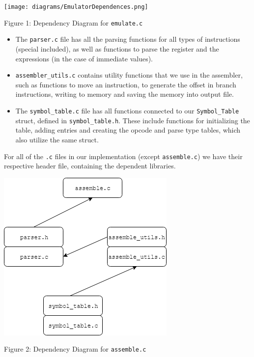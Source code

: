 \documentclass[11pt]{article}
\begin{document}
\hspace{0.05\linewidth}
\begin{minipage}{0.35\linewidth}

\centering

\texttt{[image: diagrams/EmulatorDependences.png]}
\caption{Figure 1: Dependency Diagram for \texttt{emulate.c}}

\end{minipage}
    \begin{itemize}
    \item The \texttt{parser.c} file has all the parsing functions for all types of instructions (special included), as well as functions to parse the register and the expressions (in the case of immediate values).
    \end{itemize}
\begin{minipage}{0.6\linewidth}
    \begin{itemize}
    \item \texttt{assembler\_utils.c} contains utility functions that we use in the assembler, such as functions to move an instruction, to generate the offset in branch instructions, writing to memory and saving the memory into output file.
    \item The \texttt{symbol\_table.c} file has all functions connected to our \texttt{Symbol\_Table} struct, defined in \texttt{symbol\_table.h}. These include functions for initializing the table, adding entries and creating the opcode and parse type tables, which also utilize the same struct.
\end{itemize}
\par For all of the \texttt{.c} files in our implementation (except \texttt{assemble.c}) we have their respective header file, containing the dependent libraries.
\end{minipage}
\hspace{0.05\linewidth}
\begin{minipage}{0.35\linewidth}

\centering
\vspace{5mm}
\includegraphics[scale=0.8]{diagrams/AssemblerDependencies.png}
\caption{Figure 2: Dependency Diagram for \texttt{assemble.c}}

\end{minipage}
\end{document}
